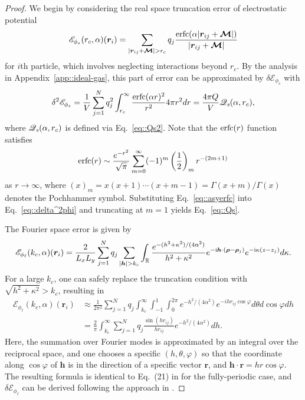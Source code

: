 \begin{proof}
	We begin by considering the real space truncation error of electrostatic potential 
	\begin{equation}
		\mathscr{E}_{\phi_{s}}(r_c,\alpha)(\bm{r}_{i}) = \sum_{|\bm{r}_{ij} + \V{\mathcal{M}}|>r_c}q_{j} \frac{\erfc(\alpha|\bm{r}_{ij} + \V{\mathcal{M}}|)}{|\bm{r}_{ij} + \V{\mathcal{M}}|}
	\end{equation}
	for $i$th particle, which involves neglecting interactions beyond $r_c$. By the analysis in Appendix~\ref{app::ideal-gas}, this part of error can be approximated by $\delta\mathscr{E}_{\phi_{s}}$ with 
	\begin{equation}\label{eq::delta^2phi}
		\delta^2\mathscr{E}_{\phi_{s}}=  \frac{1}{V}\sum_{j=1}^{N}q_{j}^2\int_{r_c}^{\infty}\frac{\operatorname{erfc}(\alpha r)^2}{r^2}4\pi r^2dr=\frac{4\pi Q}{V}\mathscr{Q}_{\emph{s}}(\alpha,r_c),
	\end{equation}
	where $\mathscr{Q}_{\emph{s}}(\alpha,r_c)$ is defined via Eq.~\eqref{eq::Qs2}. Note that the $\operatorname{erfc}(r)$ function satisfies \cite[pp.~109--112]{olver1997asymptotics}
	\begin{equation}\label{eq::asyerfc}
		\operatorname{erfc}(r)\sim\frac{e^{-r^2}}{\sqrt{\pi}}\sum_{m=0}^{\infty}(-1)^{m}\left(\frac{1}{2}\right)_m r^{-(2m+1)}
	\end{equation}
	as $r\rightarrow \infty$, where $(x)_m=x(x+1)\cdots(x+m-1)=\Gamma(x+m)/\Gamma(x)$ denotes the Pochhammer symbol. Substituting Eq.~\eqref{eq::asyerfc} into Eq.~\eqref{eq::delta^2phi} and truncating at $m=1$ yields Eq.~\eqref{eq::Qs}. 

	The Fourier space error is given by
	\begin{equation}
		\mathscr{E}_{\phi_{\ell}}(k_c,\alpha)(\bm{r}_{i})=\frac{2}{L_xL_y}\sum_{j=1}^{N}q_{j}\sum_{|\bm{h}|>k_c}\int_{\mathbb{R}}\frac{e^{-(h^2+\kappa^2)/(4\alpha^2)}}{h^2+\kappa^2}e^{-\m{i} \bm{h}\cdot(\bm{\rho}-\bm{\rho}_{j})}e^{-\m{i} \kappa(z-z_{j})}d\kappa.
	\end{equation}
	For a large $k_c$, one can safely replace the truncation condition with $\sqrt{h^2+\kappa^2}>k_c$, resulting in
	\begin{equation}
		\begin{split}
			\mathscr{E}_{\phi_{\ell}}(k_c,\alpha)(\bm{r}_{i})&\approx \frac{1}{2\pi^2}\sum_{j=1}^{N}q_{j} \int_{k_c}^{\infty}\int_{-1}^{1}\int_{0}^{2\pi}e^{-h^2/(4\alpha^2)}e^{-i h r_{ij}\cos\varphi}d\theta d\cos\varphi dh\\
			&=\frac{2}{\pi}\int_{k_c}^{\infty}\sum_{j=1}^{N}q_{j}\frac{\sin(h r_{ij})}{h r_{ij}}e^{-h^2/(4\alpha^2)}dh.
		\end{split}
	\end{equation}
	Here, the summation over Fourier modes is approximated by an integral over the reciprocal space, and one chooses a specific $(h,\theta,\varphi)$ so that the coordinate along $\cos\varphi$ of $\bm{h}$ is in the direction of a specific vector $\bm{r}$, and $\bm{h}\cdot\bm{r}=h r \cos\varphi$.
	The resulting formula is identical to Eq.~(21) in \cite{kolafa1992cutoff} for the fully-periodic case, and $\delta \mathscr{E}_{\phi_{\ell}}$ can be derived following the approach in \cite{kolafa1992cutoff}. 
\end{proof}


